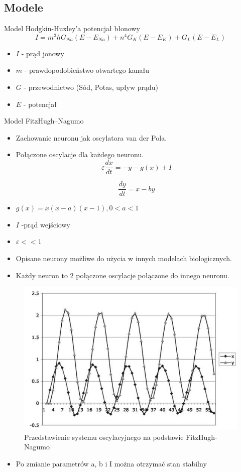 \documentclass{beamer}
\begin{document}
\subsection{Modele}
\begin{frame}{Model Hodgkin-Huxley'a}
potencjał błonowy 
$$I=m^3 hG_{Na} (E-E_{Na}) + n^4G_K(E-E_K)+G_L(E-E_L) $$
\begin{itemize}
\item $I$ - prąd jonowy
\item $m$ - prawdopodobieństwo otwartego kanału
\item $G$ - przewodnictwo (Sód, Potas, upływ prądu)
\item $E$ - potencjał
\end{itemize}
\end{frame}
\begin{frame}{Model FitzHugh–Nagumo}
\begin{itemize}
\item Zachowanie neuronu jak oscylatora van der Pola. 
\item Połączone oscylacje dla każdego neuronu.
$$\varepsilon \frac{dx}{dt} = -y-g(x)+I$$

$$\frac{dy}{dt} = x -by$$
\item $g(x)=x(x-a)(x-1),0<a<1$ 
\item $I$ -prąd wejściowy
\item $\varepsilon<<1$
\item Opisane neurony możliwe do użycia w innych modelach biologicznych.
\item Każdy neuron to 2 połączone oscylacje połączone do innego neuronu.
\end {itemize}
\end {frame}
\begin {frame}
\begin{figure}[ht]
	\begin{minipage}{0.48\linewidth}
	\centering
	\includegraphics[width=\textwidth]{OscillatoryFN.png}
	\caption{Przedstawienie systemu oscylacyjnego na podstawie FitzHugh-Nagumo}
	\end{minipage}
\end{figure}
\begin{itemize}
\item Po zmianie parametrów a, b i I można otrzymać stan stabilny
\end{itemize}
\end{frame}
\end{document}
